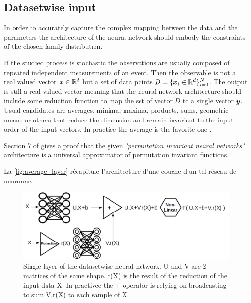 \subsection{Datasetwise input} %
\label{sub:datasetwise_input}


In order to accurately capture the complex mapping between the data and the parameters the architecture of the neural network should embody the constraints of the chosen family distribution.

If the studied process is stochastic the observations are usually composed of repeated independent measurements of an event.
Then the observable is not a real valued vector ${\bm{x}} \in \mathbb{R}^d$ but a set of data points $D = \{{\bm{x}}_i \in \mathbb{R}^d \}_{i=0}^N$.
The output is still a real valued vector meaning that the neural network architecture should include some reduction function to map the set of vector $D$ to a single vector ${\bm{y}}$.
Usual candidates are averages, minima, maxima, products, sums, geometric means or others that reduce the dimension and remain invariant to the input order of the input vectors.
In practice the average is the favorite one \needcite.

Section 7 of \cite{lucas:hal-01791126} gives a proof that the given \emph{"permutation invariant neural networks"} architecture is a universal approximator of permutation invariant functions.


La \autoref{fig:average_layer} récapitule l'architecture d'une couche d'un tel réseau de neuronne.

\begin{figure}[htb]
    \includegraphics[width=\linewidth]{average_layer}
    \caption{Single layer of the datasetwise neural network. U and V are 2 matrices of the same shape. r(X) is the result of the reduction of the input data X. In practivce the + operator is relying on broadcasting to sum V.r(X) to each sample of X.}
    \label{fig:average_layer}
\end{figure}


